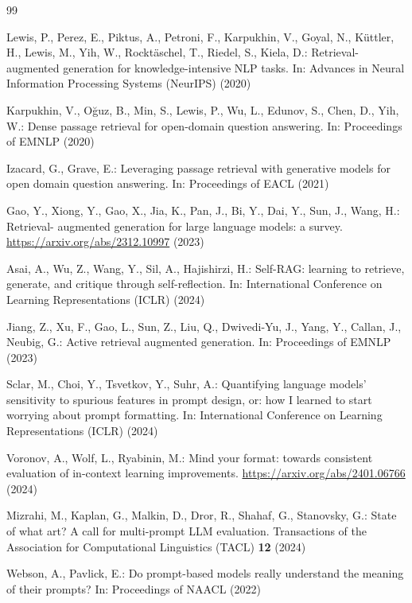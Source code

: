 ﻿\documentclass[11pt]{article}
\begin{document}
\begin{thebibliography}{99}

Lewis, P., Perez, E., Piktus, A., Petroni, F., Karpukhin, V., Goyal, N., K\"uttler, H., Lewis,
M., Yih, W., Rockt\"aschel, T., Riedel, S., Kiela, D.: Retrieval-augmented generation for
knowledge-intensive NLP tasks. In: Advances in Neural Information Processing Systems (NeurIPS)
(2020)

Karpukhin, V., O\u{g}uz, B., Min, S., Lewis, P., Wu, L., Edunov, S., Chen, D., Yih, W.: Dense
passage retrieval for open-domain question answering. In: Proceedings of EMNLP (2020)

Izacard, G., Grave, E.: Leveraging passage retrieval with generative models for open domain
question answering. In: Proceedings of EACL (2021)

Gao, Y., Xiong, Y., Gao, X., Jia, K., Pan, J., Bi, Y., Dai, Y., Sun, J., Wang, H.: Retrieval-
augmented generation for large language models: a survey.
\url{https://arxiv.org/abs/2312.10997} (2023)

Asai, A., Wu, Z., Wang, Y., Sil, A., Hajishirzi, H.: Self-RAG: learning to retrieve, generate,
and critique through self-reflection. In: International Conference on Learning Representations
(ICLR) (2024)

Jiang, Z., Xu, F., Gao, L., Sun, Z., Liu, Q., Dwivedi-Yu, J., Yang, Y., Callan, J., Neubig, G.:
Active retrieval augmented generation. In: Proceedings of EMNLP (2023)

Sclar, M., Choi, Y., Tsvetkov, Y., Suhr, A.: Quantifying language models' sensitivity to
spurious features in prompt design, or: how I learned to start worrying about prompt
formatting. In: International Conference on Learning Representations (ICLR) (2024)

Voronov, A., Wolf, L., Ryabinin, M.: Mind your format: towards consistent evaluation of
in-context learning improvements. \url{https://arxiv.org/abs/2401.06766} (2024)

Mizrahi, M., Kaplan, G., Malkin, D., Dror, R., Shahaf, G., Stanovsky, G.: State of what art? A
call for multi-prompt LLM evaluation. Transactions of the Association for Computational
Linguistics (TACL) \textbf{12} (2024)

Webson, A., Pavlick, E.: Do prompt-based models really understand the meaning of their prompts?
In: Proceedings of NAACL (2022)


\end{thebibliography}
\end{document}
